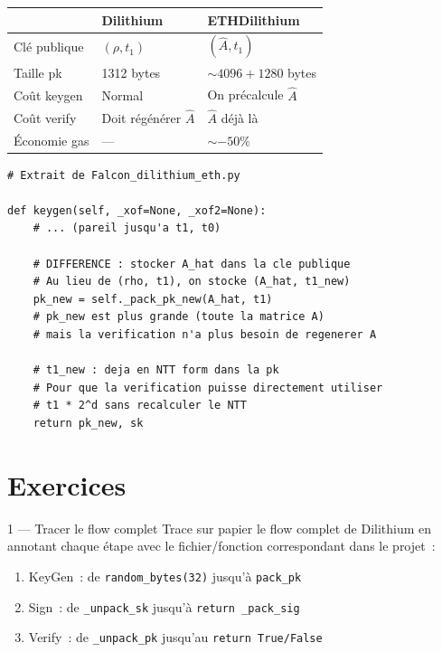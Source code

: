 \documentclass[12pt, a4paper]{article}
\begin{document}
\begin{center}
\begin{tabular}{lll}
\toprule
& \textbf{Dilithium} & \textbf{ETHDilithium} \\
\midrule
Clé publique & $(\rho, t_1)$ & $(\hat{A}, t_1)$ \\
Taille pk & 1312 bytes & $\sim 4096 + 1280$ bytes \\
Coût keygen & Normal & On précalcule $\hat{A}$ \\
Coût verify & Doit régénérer $\hat{A}$ & $\hat{A}$ déjà là \\
Économie gas & --- & $\sim -50\%$ \\
\bottomrule
\end{tabular}
\end{center}

\begin{lstlisting}[style=python]
# Extrait de Falcon_dilithium_eth.py

def keygen(self, _xof=None, _xof2=None):
    # ... (pareil jusqu'a t1, t0)

    # DIFFERENCE : stocker A_hat dans la cle publique
    # Au lieu de (rho, t1), on stocke (A_hat, t1_new)
    pk_new = self._pack_pk_new(A_hat, t1)
    # pk_new est plus grande (toute la matrice A)
    # mais la verification n'a plus besoin de regenerer A

    # t1_new : deja en NTT form dans la pk
    # Pour que la verification puisse directement utiliser
    # t1 * 2^d sans recalculer le NTT
    return pk_new, sk
\end{lstlisting}

\section{Exercices}

\begin{exercice}{1 --- Tracer le flow complet}
Trace sur papier le flow complet de Dilithium en annotant chaque étape
avec le fichier/fonction correspondant dans le projet~:

\begin{enumerate}[label=\alph*)]
  \item KeyGen~: de \texttt{random\_bytes(32)} jusqu'à \texttt{pack\_pk}
  \item Sign~: de \texttt{\_unpack\_sk} jusqu'à \texttt{return \_pack\_sig}
  \item Verify~: de \texttt{\_unpack\_pk} jusqu'au \texttt{return True/False}
\end{enumerate}
\end{exercice}
\end{document}
